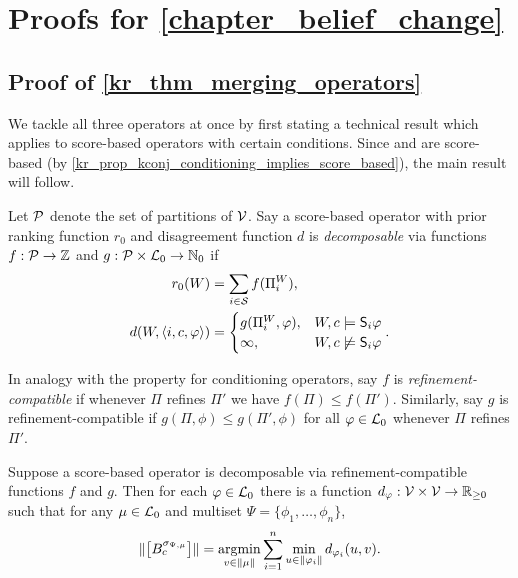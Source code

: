 \chapter{Proofs for \cref{chapter_belief_change}}

\section{Proof of \cref{kr_thm_merging_operators}}
\label{kr_app_sec_thm_merging_operators}

\restatekrmergingthm*

We tackle all three operators at once by first stating a technical result which
applies to score-based operators with certain conditions. Since \varbasedcond{}
and \partbasedcond{} are score-based (by
\cref{kr_prop_kconj_conditioning_implies_score_based}), the main result will
follow.

Let $\mathcal{P}$ denote the set of partitions of $\mathcal{V}$. Say a score-based
operator with prior ranking function $r_0$ and disagreement function $d$ is
\emph{decomposable} via functions $f: \mathcal{P} \to \mathbb{Z}$ and $g: \mathcal{P}
\times \mathcal{L}{}_0 \to \mathbb{N}_0$ if
\begin{align*}
    r_0(W) &= \sum_{i \in \mathcal{S}}{f(\Pi^W_i)}, \\
    d(W, \langle {i, c, \varphi} \rangle) &= \begin{cases}
        g(\Pi^W_i, \varphi),& W, c \models \mathsf{S}_i\varphi \\
        \infty,& W, c \not\models \mathsf{S}_i\varphi
    \end{cases}.
\end{align*}

In analogy with the  property for conditioning operators, say $f$
is \emph{refinement-compatible} if whenever $\Pi$ refines $\Pi'$ we have
$f(\Pi) \le f(\Pi')$. Similarly, say $g$ is refinement-compatible if $g(\Pi,
\phi) \le g(\Pi', \phi)$ for all $\varphi \in \mathcal{L}{}_0$ whenever $\Pi$ refines
$\Pi'$.

\begin{lemma}
    \label{kr_app_lemma_score_based_merging}
    Suppose a score-based operator is decomposable via refinement-compatible
    functions $f$ and $g$. Then for each $\varphi \in \mathcal{L}{}_0$ there is a function
    $d_\varphi: \mathcal{V} \times \mathcal{V} \to \mathbb{R}_{\ge 0}$ such that
    for any $\mu \in \mathcal{L}{}_0$ and multiset
    $\Psi = \{\phi_1, \ldots, \phi_n\}$,
    \begin{equation}
        \label{kr_app_eqn_merging}
        \propmods{\proppart{B^{\sigma_{\Psi, \mu}}_c}}
        =
        \argmin_{v \in \propmods{\mu}}{
            \sum_{i=1}^{n}{
                \min_{u \in \propmods{\phi_i}}{
                    d_{\phi_i}(u, v)
                }
            }
        }.
    \end{equation}
\end{lemma}

